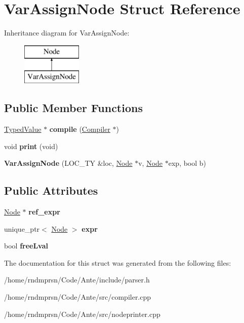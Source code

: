 \hypertarget{structVarAssignNode}{}\section{Var\+Assign\+Node Struct Reference}
\label{structVarAssignNode}
Inheritance diagram for Var\+Assign\+Node\+:\begin{figure}[H]
\begin{center}
\leavevmode
\includegraphics[height=2.000000cm]{structVarAssignNode}
\end{center}
\end{figure}
\subsection*{Public Member Functions}
\begin{DoxyCompactItemize}
\item 
\mbox{\label{structVarAssignNode_a8ad8116c4e2f58c4c5ac33af16781d37}} 
\hyperlink{structTypedValue}{Typed\+Value} $\ast$ {\bfseries compile} (\hyperlink{structante_1_1Compiler}{Compiler} $\ast$)
\item 
\mbox{\label{structVarAssignNode_aa2e9107361f0b4fcb769985c1649b94f}} 
void {\bfseries print} (void)
\item 
\mbox{\label{structVarAssignNode_a23858037419a049aa64747b45a0340ff}} 
{\bfseries Var\+Assign\+Node} (L\+O\+C\+\_\+\+TY \&loc, \hyperlink{structNode}{Node} $\ast$v, \hyperlink{structNode}{Node} $\ast$exp, bool b)
\end{DoxyCompactItemize}
\subsection*{Public Attributes}
\begin{DoxyCompactItemize}
\item 
\mbox{\label{structVarAssignNode_a51c7dbc6998b79fc922f51f7e5ab6e0f}} 
\hyperlink{structNode}{Node} $\ast$ {\bfseries ref\+\_\+expr}
\item 
\mbox{\label{structVarAssignNode_aa95de5459348ffeab305b70f413f87ca}} 
unique\+\_\+ptr$<$ \hyperlink{structNode}{Node} $>$ {\bfseries expr}
\item 
\mbox{\label{structVarAssignNode_a9a71600b48480047c4267d6ca9d794b9}} 
bool {\bfseries free\+Lval}
\end{DoxyCompactItemize}


The documentation for this struct was generated from the following files\+:\begin{DoxyCompactItemize}
\item 
/home/rndmprsn/\+Code/\+Ante/include/parser.\+h\item 
/home/rndmprsn/\+Code/\+Ante/src/compiler.\+cpp\item 
/home/rndmprsn/\+Code/\+Ante/src/nodeprinter.\+cpp\end{DoxyCompactItemize}
